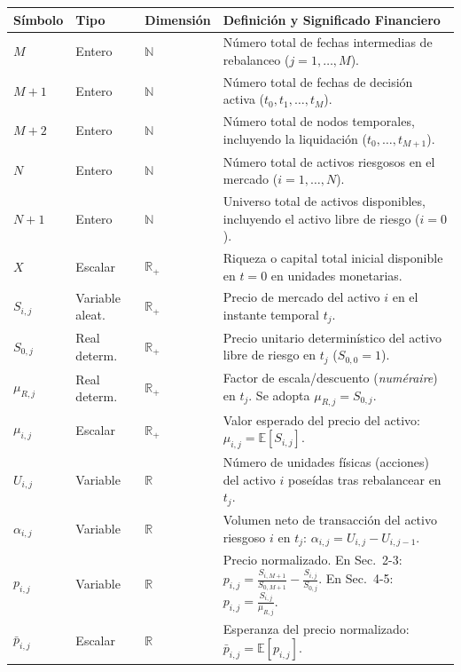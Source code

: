 \documentclass[11pt,a4paper]{report}
\numberwithin{equation}{chapter}
\begin{document}
\begin{table}[H]
\centering
\small
\renewcommand{\arraystretch}{1.25}
\begin{tabularx}{\textwidth}{lp{2.2cm}p{2.3cm}X}
\toprule
\textbf{Símbolo} & \textbf{Tipo} & \textbf{Dimensión} & \textbf{Definición y Significado Financiero} \\
\midrule
$M$ & Entero & $\mathbb{N}$ & Número total de fechas intermedias de rebalanceo ($j=1,\dots,M$). \\
$M+1$ & Entero & $\mathbb{N}$ & Número total de fechas de decisión activa ($t_0, t_1, \dots, t_M$). \\
$M+2$ & Entero & $\mathbb{N}$ & Número total de nodos temporales, incluyendo la liquidación ($t_0, \dots, t_{M+1}$). \\
$N$ & Entero & $\mathbb{N}$ & Número total de activos riesgosos en el mercado ($i=1,\dots,N$). \\
$N+1$ & Entero & $\mathbb{N}$ & Universo total de activos disponibles, incluyendo el activo libre de riesgo ($i=0$). \\
$X$ & Escalar & $\mathbb{R}_+$ & Riqueza o capital total inicial disponible en $t=0$ en unidades monetarias. \\
$S_{i,j}$ & Variable aleat. & $\mathbb{R}_+$ & Precio de mercado del activo $i$ en el instante temporal $t_j$. \\
$S_{0,j}$ & Real determ. & $\mathbb{R}_+$ & Precio unitario determinístico del activo libre de riesgo en $t_j$ ($S_{0,0} = 1$). \\
$\mu_{R,j}$ & Real determ. & $\mathbb{R}_+$ & Factor de escala/descuento (\emph{numéraire}) en $t_j$. Se adopta $\mu_{R,j} = S_{0,j}$. \\
$\mu_{i,j}$ & Escalar & $\mathbb{R}_+$ & Valor esperado del precio del activo: $\mu_{i,j} = \mathbb{E}[S_{i,j}]$. \\
$U_{i,j}$ & Variable & $\mathbb{R}$ & Número de unidades físicas (acciones) del activo $i$ poseídas tras rebalancear en $t_j$. \\
$\alpha_{i,j}$ & Variable & $\mathbb{R}$ & Volumen neto de transacción del activo riesgoso $i$ en $t_j$: $\alpha_{i,j} = U_{i,j} - U_{i,j-1}$. \\
$p_{i,j}$ & Variable & $\mathbb{R}$ & Precio normalizado. En Sec.~2-3: $p_{i,j} = \frac{S_{i,M+1}}{S_{0,M+1}} - \frac{S_{i,j}}{S_{0,j}}$. En Sec.~4-5: $p_{i,j} = \frac{S_{i,j}}{\mu_{R,j}}$. \\
$\bar{p}_{i,j}$ & Escalar & $\mathbb{R}$ & Esperanza del precio normalizado: $\bar{p}_{i,j} = \mathbb{E}[p_{i,j}]$. \\

\end{tabularx}
\end{table}
\end{document}
